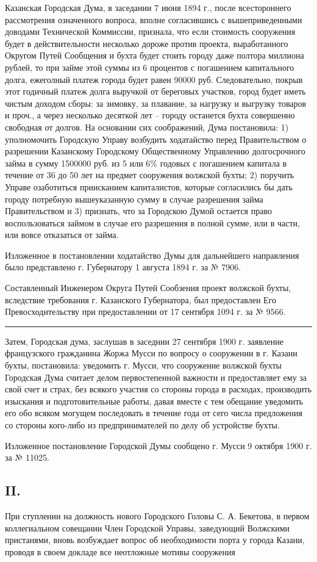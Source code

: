 \documentclass[oneside,final,14pt]{extreport}
\begin{document}
Казанская Городская Дума, в заседании 7 июня 1894 г., после всестороннего рассмотрения означенного вопроса, вполне согласившись с вышеприведенными доводами Технической Коммиссии, признала, что если стоимость сооружения будет в действительности несколько дороже против проекта, выработанного Округом Путей Сообщения и бухта будет стоить городу даже полтора миллиона рублей, то при займе этой суммы из 6 процентов с погашением капитального долга, ежеголный платеж города будет равен 90000 руб. Следовательно, покрыв этот годичный платеж долга выручкой от береговых участков, город будет иметь чистым доходом сборы: за зимовку, за плавание, за нагрузку и выгрузку товаров и проч., а через несколько десяткой лет -- городу останется бухта совершенно свободная от долгов. На основании сих соображений, Дума постановила: 1) уполномочить Городскую Управу возбудить ходатайство перед Правительством о разрешении Казанскому Городскому Общественному Управлению долгосрочного займа в сумму 1500000 руб. из 5 или 6\% годовых с погашением капитала в течение от 36 до 50 лет на предмет сооружения волжской бухты; 2) поручить Управе озаботиться приисканием капиталистов, которые согласились бы дать городу потребную вышеуказанную сумму в случае разрешения займа Правительством и 3) признать, что за Городскою Думой остается право воспользоваться займом в случае его разрешения в полной сумме, или в части, или вовсе отказаться от займа.

Изложенное в постановлении ходатайство Думы для дальнейшего направления было представлено г. Губернатору 1 августа 1894 г. за № 7906.

Составленный Инженером Округа Путей Сообзения проект волжской бухты, вследствие требования г. Казанского Губернатора, был предоставлен Его Превосходительству при предоставлении от 17 сентября 1094 г. за № 9566.
\begin{center}
\noindent\rule{4cm}{0.4pt}
\end{center}

Затем, Городская дума, заслушав в заседнии 27 сентября 1900 г. заявление французского гражданина Жоржа Мусси по вопросу о сооружении в г. Казани бухты, постановила: уведомить г. Мусси, что сооружение волжской бухты Городская Дума считает делом первостепенной важности и предоставляет ему за свой счет и страх, без всякого участия со стороны города в расходах, производить изыскания и подготовительные работы, давая вместе с тем обещание уведомить его обо всяком могущем последовать в течение года от сего числа предложения со стороны кого-либо из предпринимателей по делу об устройстве бухты.

Изложенное постановление Городской Думы сообщено г. Мусси 9 октября 1900 г. за № 11025.

{%
	\centering
	\subsection*{II.}
}
При ступлении на должность нового Городского Головы С. А. Бекетова, в первом коллегиальном совещании Член Городской Управы, заведующий Волжскими пристанями, вновь возбуждает вопрос об необходимости порта у города Казани, проводя в своем докладе все неотложные мотивы сооружения
\end{document}
